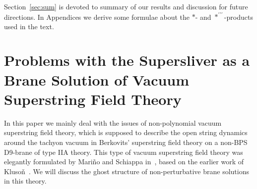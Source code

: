 \documentclass[a4paper,12pt]{article}
\newcommand{\tp}{\prime\prime\prime}
\newcommand{\sectiono}[1]{\section{#1}\setcounter{equation}{0}}
\begin{document}
Section~\ref{sec:sum} is devoted to summary of our results and discussion for future directions. 
In Appendices we derive some formulae about the $*$- and $*^{\tp}$-products used in the text. 


\sectiono{Problems with the Supersliver as a Brane Solution of Vacuum Superstring Field 
Theory}\label{sec:2}
In this paper we mainly deal with the issues of non-polynomial vacuum superstring field theory, 
which is supposed to describe the open string dynamics around the tachyon vacuum in 
Berkovits' superstring field theory on a non-BPS D9-brane of type IIA theory. 
This type of vacuum superstring field theory was elegantly formulated by Mari{\~n}o and 
Schiappa in~\cite{MS}, based on the earlier work of Kluso\v{n}~\cite{Klu5}. 
We will discuss the ghost structure of non-perturbative brane solutions in this theory. 
\medskip
\end{document}
